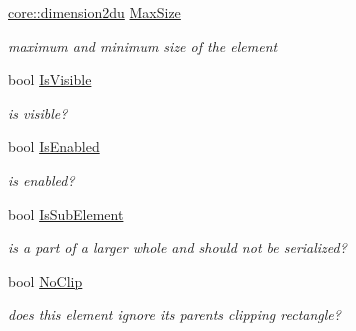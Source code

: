 \begin{DoxyCompactItemize}
\mbox{\label{classirr_1_1gui_1_1IGUIElement_a1649a1c740c333bfb026397411c4da95}} 
\hyperlink{namespaceirr_1_1core_ad2e562e3219072e2f7fc7c2bba0ef0cb}{core\+::dimension2du} \hyperlink{classirr_1_1gui_1_1IGUIElement_a1649a1c740c333bfb026397411c4da95}{Max\+Size}
\begin{DoxyCompactList}\small\item\em maximum and minimum size of the element \end{DoxyCompactList}\item 
\mbox{\label{classirr_1_1gui_1_1IGUIElement_ad8dd8fdfb5be3e4cca1f1603cbcfaccf}} 
bool \hyperlink{classirr_1_1gui_1_1IGUIElement_ad8dd8fdfb5be3e4cca1f1603cbcfaccf}{Is\+Visible}
\begin{DoxyCompactList}\small\item\em is visible? \end{DoxyCompactList}\item 
\mbox{\label{classirr_1_1gui_1_1IGUIElement_aba90d3c36184d3b6d62a8856a8734590}} 
bool \hyperlink{classirr_1_1gui_1_1IGUIElement_aba90d3c36184d3b6d62a8856a8734590}{Is\+Enabled}
\begin{DoxyCompactList}\small\item\em is enabled? \end{DoxyCompactList}\item 
\mbox{\label{classirr_1_1gui_1_1IGUIElement_a19f65c7004c5b36c848dad776aabc151}} 
bool \hyperlink{classirr_1_1gui_1_1IGUIElement_a19f65c7004c5b36c848dad776aabc151}{Is\+Sub\+Element}
\begin{DoxyCompactList}\small\item\em is a part of a larger whole and should not be serialized? \end{DoxyCompactList}\item 
\mbox{\label{classirr_1_1gui_1_1IGUIElement_a8f9ad427fe094e0e8c49cf205c606526}} 
bool \hyperlink{classirr_1_1gui_1_1IGUIElement_a8f9ad427fe094e0e8c49cf205c606526}{No\+Clip}
\begin{DoxyCompactList}\small\item\em does this element ignore its parent\textquotesingle{}s clipping rectangle? \end{DoxyCompactList}\item 

\end{DoxyCompactItemize}

